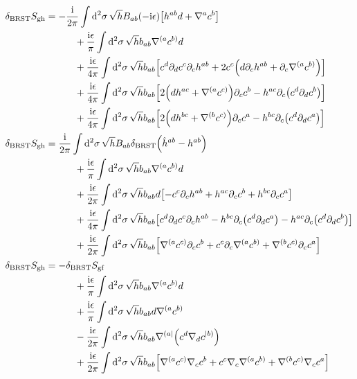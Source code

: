 \begin{align*}
    \delta_{\textnormal{BRST}}S_{\textnormal{gh}}&=-\frac{\im}{2\pi}\int\dd[2]{\sigma}\sqrt{h}B_{ab}\qty(-\im\epsilon)\qty[h^{ab}d+\nabla^ac^b]\\
    &\quad\quad\quad+\frac{\im\epsilon}{\pi}\int\dd[2]{\sigma}\sqrt{h}b_{ab}\nabla^{(a}c^{b)}d\\
    &\quad\quad\quad+\frac{\im\epsilon}{4\pi}\int\dd[2]{\sigma}\sqrt{h}b_{ab}\qty[c^d\partial_dc^c\partial_ch^{ab}+2 c^c\qty(d\partial_ch^{ab}+\partial_c\nabla^{(a}c^{b)})]\\
    &\quad\quad\quad+\frac{\im\epsilon}{4\pi}\int\dd[2]{\sigma}\sqrt{h}b_{ab}\qty[2\qty(dh^{ac}+\nabla^{(a}c^{c)})\partial_cc^b-h^{ac}\partial_c\qty(c^d\partial_dc^b)]\\
    &\quad\quad\quad+\frac{\im\epsilon}{4\pi}\int\dd[2]{\sigma}\sqrt{h}b_{ab}\qty[2\qty(dh^{bc}+\nabla^{(b}c^{c)})\partial_cc^a- h^{bc}\partial_c\qty(c^d\partial_d c^a)]\\
    \delta_{\textnormal{BRST}}S_{\textnormal{gh}}&=\frac{\im}{2\pi}\int\dd[2]{\sigma}\sqrt{h}B_{ab}\delta_{\textnormal{BRST}}\qty(\hat h^{ab}-h^{ab})\\
    &\quad\quad\quad+\frac{\im\epsilon}{\pi}\int\dd[2]{\sigma}\sqrt{h}b_{ab}\nabla^{(a}c^{b)}d\\
    &\quad\quad\quad+\frac{\im\epsilon}{2\pi}\int\dd[2]{\sigma}\sqrt{h}b_{ab}d\qty[-c^c\partial_ch^{ab}+h^{ac}\partial_cc^b+h^{bc}\partial_cc^a]\\
    &\quad\quad\quad+\frac{\im\epsilon}{4\pi}\int\dd[2]{\sigma}\sqrt{h}b_{ab}\qty[c^d\partial_dc^c\partial_ch^{ab}- h^{bc}\partial_c\qty(c^d\partial_d c^a)-h^{ac}\partial_c\qty(c^d\partial_dc^b)]\\
    &\quad\quad\quad+\frac{\im\epsilon}{2\pi}\int\dd[2]{\sigma}\sqrt{h}b_{ab}\qty[\nabla^{(a}c^{c)}\partial_cc^b+ c^c\partial_c\nabla^{(a}c^{b)}+\nabla^{(b}c^{c)}\partial_cc^a]\\
    \delta_{\textnormal{BRST}}S_{\textnormal{gh}}&=-\delta_{\textnormal{BRST}}S_{\textnormal{gf}}\\
    &\quad\quad\quad+\frac{\im\epsilon}{\pi}\int\dd[2]{\sigma}\sqrt{h}b_{ab}\nabla^{(a}c^{b)}d\\
    &\quad\quad\quad+\frac{\im\epsilon}{\pi}\int\dd[2]{\sigma}\sqrt{h}b_{ab}d\nabla^{(a}c^{b)}\\
    &\quad\quad\quad-\frac{\im\epsilon}{2\pi}\int\dd[2]{\sigma}\sqrt{h}b_{ab}\nabla^{(a|}\qty(c^d\nabla_dc^{|b)})\\
    &\quad\quad\quad+\frac{\im\epsilon}{2\pi}\int\dd[2]{\sigma}\sqrt{h}b_{ab}\qty[\nabla^{(a}c^{c)}\nabla_cc^b+ c^c\nabla_c\nabla^{(a}c^{b)}+\nabla^{(b}c^{c)}\nabla_cc^a]\\

\end{align*}

